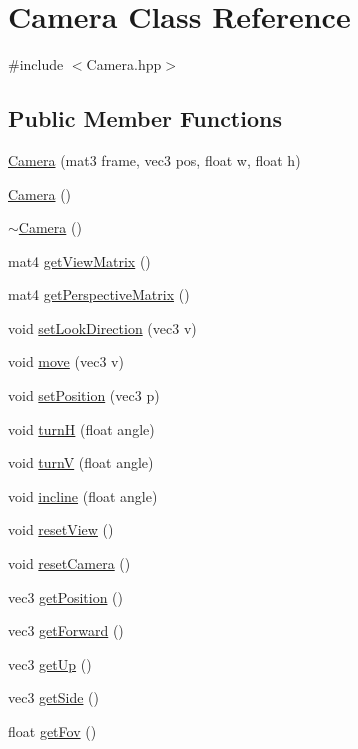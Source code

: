 \hypertarget{classCamera}{}\section{Camera Class Reference}
\label{classCamera}


{\ttfamily \#include $<$Camera.\+hpp$>$}

\subsection*{Public Member Functions}
\begin{DoxyCompactItemize}
\item 
\mbox{\hyperlink{classCamera_af50a1edab8d04a870747c6d52ad7e51e}{Camera}} (mat3 frame, vec3 pos, float w, float h)
\item 
\mbox{\hyperlink{classCamera_a01f94c3543f56ede7af49dc778f19331}{Camera}} ()
\item 
\mbox{\hyperlink{classCamera_ad1897942d0ccf91052386388a497349f}{$\sim$\+Camera}} ()
\item 
mat4 \mbox{\hyperlink{classCamera_a26c21a39c99b37158c16b0b16a3b0a56}{get\+View\+Matrix}} ()
\item 
mat4 \mbox{\hyperlink{classCamera_ad181799f11038f16667aa53bb5b68945}{get\+Perspective\+Matrix}} ()
\item 
void \mbox{\hyperlink{classCamera_ab714eaa26dcdf34a9de4b8aef36b3809}{set\+Look\+Direction}} (vec3 v)
\item 
void \mbox{\hyperlink{classCamera_a35d93a9130ec85a19d76154ee8fc8b2b}{move}} (vec3 v)
\item 
void \mbox{\hyperlink{classCamera_af00b6bee171d6d24893784589f5fb977}{set\+Position}} (vec3 p)
\item 
void \mbox{\hyperlink{classCamera_a9d7b1b2a24086391c13cbdb102564580}{turnH}} (float angle)
\item 
void \mbox{\hyperlink{classCamera_a41ea4b455072dc7fa34d2093f5acd76c}{turnV}} (float angle)
\item 
void \mbox{\hyperlink{classCamera_add348dd18fb069dfad8ff7c941adf2d4}{incline}} (float angle)
\item 
void \mbox{\hyperlink{classCamera_ad7e8f779ab27268fe301c3e4db4187a5}{reset\+View}} ()
\item 
void \mbox{\hyperlink{classCamera_aee8027b5309a5dc77db956d27924c387}{reset\+Camera}} ()
\item 
vec3 \mbox{\hyperlink{classCamera_a4ab9f56675dc67486c0ce95086bda56d}{get\+Position}} ()
\item 
vec3 \mbox{\hyperlink{classCamera_a530fa6698a43a61be7a78d60dddb45c2}{get\+Forward}} ()
\item 
vec3 \mbox{\hyperlink{classCamera_a20bc33698379856dc3a146f4191ae7d0}{get\+Up}} ()
\item 
vec3 \mbox{\hyperlink{classCamera_adbd8e27eae5a396f5f96a69a513f4cd6}{get\+Side}} ()
\item 
float \mbox{\hyperlink{classCamera_a71e957327f96cd913cd1ecd7d42c35e3}{get\+Fov}} ()
\end{DoxyCompactItemize}
